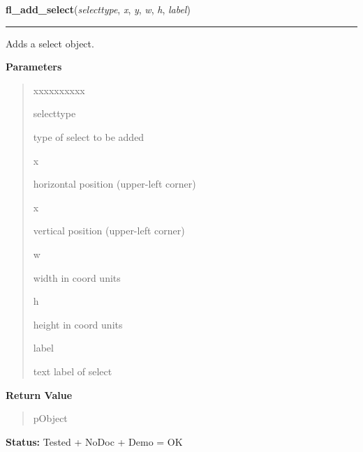     \label{xformslib:library:fl_add_select}

    \vspace{0.5ex}

\hspace{.8\funcindent}\begin{boxedminipage}{\funcwidth}

    \raggedright \textbf{fl\_add\_select}(\textit{selecttype}, \textit{x}, \textit{y}, \textit{w}, \textit{h}, \textit{label})

    \vspace{-1.5ex}

    \rule{\textwidth}{0.5\fboxrule}
\setlength{\parskip}{2ex}
    Adds a select object.

\setlength{\parskip}{1ex}
      \textbf{Parameters}
      \vspace{-1ex}

      \begin{quote}
        \begin{Ventry}{xxxxxxxxxx}

          \item[selecttype]

          type of select to be added

          \item[x]

          horizontal position (upper-left corner)

          \item[x]

          vertical position (upper-left corner)

          \item[w]

          width in coord units

          \item[h]

          height in coord units

          \item[label]

          text label of select

        \end{Ventry}

      \end{quote}

      \textbf{Return Value}
    \vspace{-1ex}

      \begin{quote}
      pObject

      \end{quote}

\textbf{Status:} Tested + NoDoc + Demo = OK



    \end{boxedminipage}


